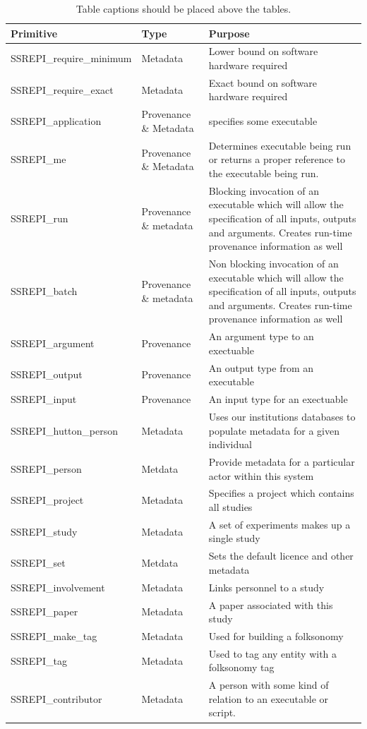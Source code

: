 \documentclass[runningheads]{llncs}
\begin{document}
\begin{table}
\caption{Table captions should be placed above the
tables.}\label{tab:commands}
    \begin{tabularx}{\textwidth}{|l|p{2cm}|p{6cm}|}
\hline
Primitive & Type & Purpose \\
\hline
        SSREPI\_require\_minimum & Metadata & Lower bound on software hardware required \\ SSREPI\_require\_exact & Metadata & Exact bound on software hardware required \\
        SSREPI\_application & Provenance \& Metadata & specifies some executable \\
        SSREPI\_me & Provenance \& Metadata & Determines executable being run or returns a proper reference to the executable being run. \\
        SSREPI\_run & Provenance \& metadata & Blocking invocation of an executable which will allow the specification of all inputs, outputs and arguments. Creates run-time provenance information as well \\
        SSREPI\_batch & Provenance \& metadata & Non blocking invocation of an executable which will allow the specification of all inputs, outputs and arguments. Creates run-time provenance information as well \\
        SSREPI\_argument & Provenance & An argument type to an exectuable \\
        SSREPI\_output & Provenance & An output type from an executable \\
        SSREPI\_input & Provenance & An input type for an exectuable \\
        SSREPI\_hutton\_person & Metadata & Uses our institutions databases to populate metadata for a given individual \\
        SSREPI\_person & Metdata & Provide metadata for a particular actor within this system\\
        SSREPI\_project & Metadata & Specifies a project which contains all studies \\
        SSREPI\_study & Metadata & A set of experiments makes up a single study \\
        SSREPI\_set & Metdata & Sets the default licence and other metadata \\
        SSREPI\_involvement & Metadata & Links personnel to a study \\
        SSREPI\_paper & Metadata & A paper associated with this study \\
        SSREPI\_make\_tag & Metadata & Used for building a folksonomy \\
        SSREPI\_tag & Metadata & Used to tag any entity with a folksonomy tag \\
        SSREPI\_contributor & Metadata & A  person with some kind of relation to an executable or script. \\


\end{tabularx}
\end{table}
\end{document}

